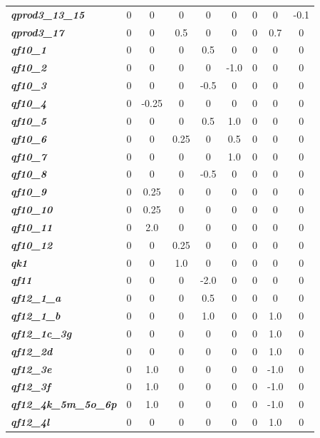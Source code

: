 \documentclass[a4paper,11pt]{article}
\begin{document}
\begin{table}[H]
\begin{center}
{\begin{tabular}{|l|c|c|c|c|c|c|c|c|}
    \textit{\textbf{qprod3\_13\_15}} & 0 & 0 & 0 & 0 & 0 & 0 & 0 & -0.1 \\
    \textit{\textbf{qprod3\_17}} & 0 & 0 & 0.5 & 0 & 0 & 0 & 0.7 & 0 \\
    \textit{\textbf{qf10\_1}} & 0 & 0 & 0 & 0.5 & 0 & 0 & 0 & 0 \\
    \textit{\textbf{qf10\_2}} & 0 & 0 & 0 & 0 & -1.0 & 0 & 0 & 0 \\
    \textit{\textbf{qf10\_3}} & 0 & 0 & 0 & -0.5 & 0 & 0 & 0 & 0 \\
    \textit{\textbf{qf10\_4}} & 0 & -0.25 & 0 & 0 & 0 & 0 & 0 & 0 \\
    \textit{\textbf{qf10\_5}} & 0 & 0 & 0 & 0.5 & 1.0 & 0 & 0 & 0 \\
    \textit{\textbf{qf10\_6}} & 0 & 0 & 0.25 & 0 & 0.5 & 0 & 0 & 0 \\
    \textit{\textbf{qf10\_7}} & 0 & 0 & 0 & 0 & 1.0 & 0 & 0 & 0 \\
    \textit{\textbf{qf10\_8}} & 0 & 0 & 0 & -0.5 & 0 & 0 & 0 & 0 \\
    \textit{\textbf{qf10\_9}} & 0 & 0.25 & 0 & 0 & 0 & 0 & 0 & 0 \\
    \textit{\textbf{qf10\_10}} & 0 & 0.25 & 0 & 0 & 0 & 0 & 0 & 0 \\
    \textit{\textbf{qf10\_11}} & 0 & 2.0 & 0 & 0 & 0 & 0 & 0 & 0 \\
    \textit{\textbf{qf10\_12}} & 0 & 0 & 0.25 & 0 & 0 & 0 & 0 & 0 \\
    \textit{\textbf{qk1}} & 0 & 0 & 1.0 & 0 & 0 & 0 & 0 & 0 \\
    \textit{\textbf{qf11}} & 0 & 0 & 0 & -2.0 & 0 & 0 & 0 & 0 \\
    \textit{\textbf{qf12\_1\_a}} & 0 & 0 & 0 & 0.5 & 0 & 0 & 0 & 0 \\
    \textit{\textbf{qf12\_1\_b}} & 0 & 0 & 0 & 1.0 & 0 & 0 & 1.0 & 0 \\
    \textit{\textbf{qf12\_1c\_3g}} & 0 & 0 & 0 & 0 & 0 & 0 & 1.0 & 0 \\
    \textit{\textbf{qf12\_2d}} & 0 & 0 & 0 & 0 & 0 & 0 & 1.0 & 0 \\
    \textit{\textbf{qf12\_3e}} & 0 & 1.0 & 0 & 0 & 0 & 0 & -1.0 & 0 \\
    \textit{\textbf{qf12\_3f}} & 0 & 1.0 & 0 & 0 & 0 & 0 & -1.0 & 0 \\
    \textit{\textbf{qf12\_4k\_5m\_5o\_6p}} & 0 & 1.0 & 0 & 0 & 0 & 0 & -1.0 & 0 \\
    \textit{\textbf{qf12\_4l}} & 0 & 0 & 0 & 0 & 0 & 0 & 1.0 & 0 \\

\end{tabular}}
\end{center}
\end{table}
\end{document}
